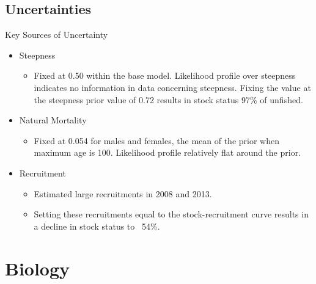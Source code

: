\documentclass[pdf]{beamer}\usepackage[]{graphicx}\usepackage[]{color}
\begin{document}
\subsection{Uncertainties}
\begin{frame}{Key Sources of Uncertainty}
  \begin{itemize}
    \item Steepness
    \begin{itemize}
      \item Fixed at 0.50 within the base model.  Likelihood profile over steepness indicates no information in data concerning steepness.  Fixing the value at the steepness     prior        value of 0.72 results in stock status 97\% of unfished.
    \end{itemize}
    \item Natural Mortality
      \begin{itemize}
        \item Fixed at 0.054 for males and females, the mean of the prior when maximum age is 100.  Likelihood profile relatively flat around the prior.
      \end{itemize}
    \item Recruitment 
      \begin{itemize} 
        \item Estimated large recruitments in 2008 and 2013. 
        \item Setting these recruitments equal to the stock-recruitment curve results in a decline in stock status to ~54\%.
      \end{itemize}
  \end{itemize}
\end{frame}



\section{Biology}

\end{document}

